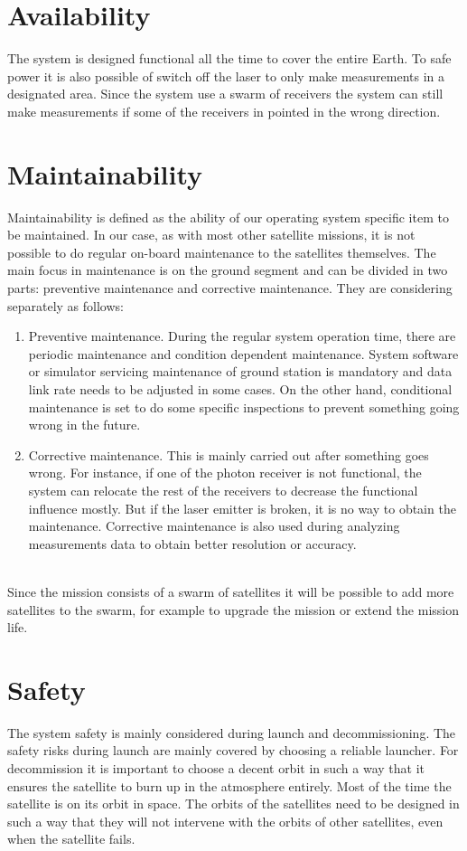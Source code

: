 \section{Availability}
\label{blRAMSavail}
The system is designed functional all the time to cover the entire Earth. To safe power it is also possible of switch off the laser to only make measurements in a designated area. Since the system use a swarm of receivers the system can still make measurements if some of the receivers in pointed in the wrong direction.

\section{Maintainability}
\label{blRAMSmaint}
Maintainability is defined as the ability of our operating system specific item to be maintained. In our case, as with most other satellite missions, it is not possible to do regular on-board maintenance to the satellites themselves. The main focus in maintenance is on the ground segment and can be divided in two parts: preventive maintenance and corrective maintenance. They are considering separately as follows: 
	\begin{enumerate}
		\item Preventive maintenance. During the regular system operation time, there are periodic maintenance and condition dependent maintenance.  System software or simulator servicing maintenance of ground station is mandatory and data link rate needs to be adjusted in some cases. On the other hand, conditional maintenance is set to do some specific inspections to prevent something going wrong in the future.
		\item Corrective maintenance. This is mainly carried out after something goes wrong. For instance, if one of the photon receiver is not functional, the system can relocate the rest of the receivers to decrease the functional influence mostly. But if the laser emitter is broken, it is no way to obtain the maintenance. Corrective maintenance is also used during analyzing measurements data to obtain better resolution or accuracy.
  	\end{enumerate}\\
Since the mission consists of a swarm of satellites it will be possible to add more satellites to the swarm, for example to upgrade the mission or extend the mission life. 

\section{Safety}
\label{blRAMSsaf} 
The system safety is mainly considered during launch and decommissioning. The safety risks during launch are mainly covered by choosing a reliable launcher. For decommission it is important to choose a decent orbit in such a way that it ensures the satellite to burn up in the atmosphere entirely. Most of the time the satellite is on its orbit in space. The orbits of the satellites need to be designed in such a way that they will not intervene with the orbits of other satellites, even when the satellite fails. 